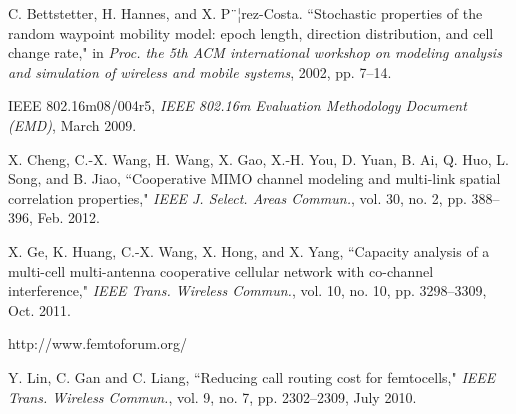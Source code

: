 \documentclass[10pt,final,journal,letterpaper,twoside,twocolumn]{IEEEtran}
\begin{document}
\begin{thebibliography}{1}
C. Bettstetter, H. Hannes, and X. P¨¦rez-Costa. ``Stochastic properties of the random waypoint mobility model: epoch length, direction distribution, and cell change rate," in {\em Proc. the 5th ACM international workshop on modeling analysis and simulation of wireless and mobile systems}, 2002, pp. 7--14.

    IEEE 802.16m08/004r5, {\em IEEE 802.16m Evaluation Methodology Document (EMD)}, March 2009.

X. Cheng, C.-X. Wang, H. Wang, X. Gao, X.-H. You, D. Yuan, B. Ai, Q. Huo, L.
Song, and B. Jiao, ``Cooperative MIMO channel modeling and multi-link spatial
correlation properties," {\em IEEE J. Select. Areas Commun.}, vol. 30,
no. 2, pp. 388--396, Feb. 2012.

X. Ge, K. Huang, C.-X. Wang, X. Hong, and X. Yang, ``Capacity analysis of a multi-cell multi-antenna cooperative cellular network with co-channel interference," {\em IEEE Trans. Wireless Commun.}, vol. 10, no. 10, pp. 3298--3309, Oct. 2011.

    http://www.femtoforum.org/

Y. Lin, C. Gan and C. Liang, ``Reducing call routing cost for femtocells,"
{\em IEEE Trans. Wireless Commun.}, vol. 9, no. 7, pp. 2302--2309, July 2010.
\end{thebibliography}
\end{document}

